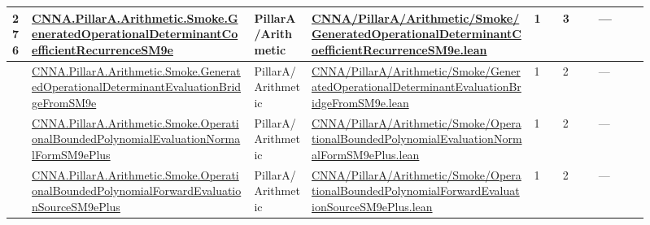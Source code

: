 \begin{longtable}{L{0.025\linewidth} L{0.315\linewidth} L{0.08\linewidth} L{0.315\linewidth} L{0.045\linewidth} L{0.055\linewidth} L{0.07\linewidth}}
276 & \href{run:repo_snapshot/CNNA/PillarA/Arithmetic/Smoke/GeneratedOperationalDeterminantCoefficientRecurrenceSM9e.lean}{CNNA.\allowbreak{}PillarA.\allowbreak{}Arithmetic.\allowbreak{}Smoke.\allowbreak{}GeneratedOperationalDeterminantCoefficientRecurrenceSM9e} & PillarA/\allowbreak{}Arithmetic & \href{run:repo_snapshot/CNNA/PillarA/Arithmetic/Smoke/GeneratedOperationalDeterminantCoefficientRecurrenceSM9e.lean}{CNNA/\allowbreak{}PillarA/\allowbreak{}Arithmetic/\allowbreak{}Smoke/\allowbreak{}GeneratedOperationalDeterminantCoefficientRecurrenceSM9e.\allowbreak{}lean} & 1 & 3 & ---\\
\hline
{} & \href{run:repo_snapshot/CNNA/PillarA/Arithmetic/Smoke/GeneratedOperationalDeterminantEvaluationBridgeFromSM9e.lean}{CNNA.\allowbreak{}PillarA.\allowbreak{}Arithmetic.\allowbreak{}Smoke.\allowbreak{}GeneratedOperationalDeterminantEvaluationBridgeFromSM9e} & PillarA/\allowbreak{}Arithmetic & \href{run:repo_snapshot/CNNA/PillarA/Arithmetic/Smoke/GeneratedOperationalDeterminantEvaluationBridgeFromSM9e.lean}{CNNA/\allowbreak{}PillarA/\allowbreak{}Arithmetic/\allowbreak{}Smoke/\allowbreak{}GeneratedOperationalDeterminantEvaluationBridgeFromSM9e.\allowbreak{}lean} & 1 & 2 & ---\\
\hline
{} & \href{run:repo_snapshot/CNNA/PillarA/Arithmetic/Smoke/OperationalBoundedPolynomialEvaluationNormalFormSM9ePlus.lean}{CNNA.\allowbreak{}PillarA.\allowbreak{}Arithmetic.\allowbreak{}Smoke.\allowbreak{}OperationalBoundedPolynomialEvaluationNormalFormSM9ePlus} & PillarA/\allowbreak{}Arithmetic & \href{run:repo_snapshot/CNNA/PillarA/Arithmetic/Smoke/OperationalBoundedPolynomialEvaluationNormalFormSM9ePlus.lean}{CNNA/\allowbreak{}PillarA/\allowbreak{}Arithmetic/\allowbreak{}Smoke/\allowbreak{}OperationalBoundedPolynomialEvaluationNormalFormSM9ePlus.\allowbreak{}lean} & 1 & 2 & ---\\
\hline
{} & \href{run:repo_snapshot/CNNA/PillarA/Arithmetic/Smoke/OperationalBoundedPolynomialForwardEvaluationSourceSM9ePlus.lean}{CNNA.\allowbreak{}PillarA.\allowbreak{}Arithmetic.\allowbreak{}Smoke.\allowbreak{}OperationalBoundedPolynomialForwardEvaluationSourceSM9ePlus} & PillarA/\allowbreak{}Arithmetic & \href{run:repo_snapshot/CNNA/PillarA/Arithmetic/Smoke/OperationalBoundedPolynomialForwardEvaluationSourceSM9ePlus.lean}{CNNA/\allowbreak{}PillarA/\allowbreak{}Arithmetic/\allowbreak{}Smoke/\allowbreak{}OperationalBoundedPolynomialForwardEvaluationSourceSM9ePlus.\allowbreak{}lean} & 1 & 2 & ---\\

\end{longtable}

